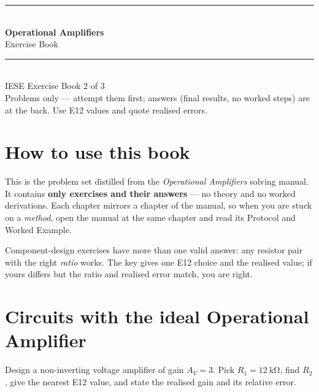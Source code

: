 \documentclass[11pt,a4paper,oneside]{book}
\begin{document}
\frontmatter

\begingroup
\thispagestyle{empty}\centering
\vspace*{2.2cm}
{\color{accent}\rule{\linewidth}{1.4pt}}\\[0.5cm]
{\Huge\bfseries\color{accent} Operational Amplifiers}\\[0.35cm]
{\LARGE Exercise Book}\\[0.4cm]
{\color{accent}\rule{\linewidth}{1.4pt}}\\[1.2cm]
{\large IESE Exercise Book 2 of 3}\\[1.6cm]
{\footnotesize Problems only --- attempt them first; answers (final results, no
worked steps) are at the back. Use E12 values and quote realised errors.}
\par\vspace*{\fill}
\endgroup
\clearpage

\chapter*{How to use this book}

This is the problem set distilled from the \emph{Operational Amplifiers} solving
manual. It contains \textbf{only exercises and their answers} --- no theory and no
worked derivations. Each chapter mirrors a chapter of the manual, so when you are
stuck on a \emph{method}, open the manual at the same chapter and read its
Protocol and Worked Example.

\begin{keyidea}
Component-design exercises have more than one valid answer: any resistor pair
with the right \emph{ratio} works. The key gives one E12 choice and the realised
value; if yours differs but the ratio and realised error match, you are right.
\end{keyidea}

\tableofcontents
\clearpage
\mainmatter

\chapter{Circuits with the ideal Operational Amplifier}

\begin{exercise}[Non-inverting design, $G=3$]
Design a non-inverting voltage amplifier of gain $A_V=3$. Pick
$R_1=\qty{12}{\kilo\ohm}$, find $R_2$, give the nearest E12 value, and state the
realised gain and its relative error.
\end{exercise}
\end{document}
